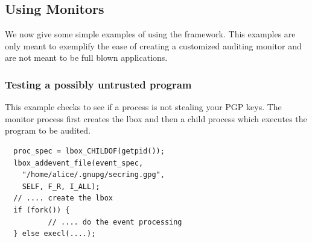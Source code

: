 


\subsection{Using Monitors}

We now give some simple examples of using the framework.
This examples are only meant to exemplify the ease of creating
a customized auditing monitor and are not meant to be full blown applications.

\subsubsection{Testing a possibly untrusted program}

This example checks to see if a process is not stealing your PGP keys.
The monitor process first creates the lbox and then a child process
which executes the program to be audited.

{
\small
\begin{verbatim}
  proc_spec = lbox_CHILDOF(getpid());
  lbox_addevent_file(event_spec,
    "/home/alice/.gnupg/secring.gpg",
    SELF, F_R, I_ALL);
  // .... create the lbox
  if (fork()) {
          // .... do the event processing
  } else execl(....);
\end{verbatim}
}


